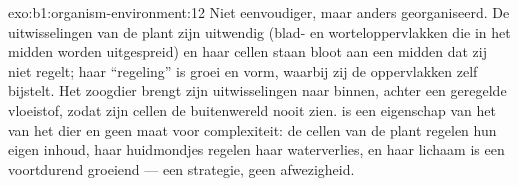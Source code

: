 \begin{solution}{exo:b1:organism-environment:12}
Niet eenvoudiger, maar anders georganiseerd. De uitwisselingen van de plant
zijn uitwendig (blad- en worteloppervlakken die in het midden worden
uitgespreid) en haar cellen staan bloot aan een midden dat zij niet regelt;
haar ``regeling'' is groei en vorm, waarbij zij de oppervlakken zelf bijstelt.
Het zoogdier brengt zijn uitwisselingen naar binnen, achter een geregelde
vloeistof, zodat zijn cellen de buitenwereld nooit zien.  is een
eigenschap van het  van het dier en geen maat voor complexiteit:
de cellen van de plant regelen hun eigen inhoud, haar huidmondjes regelen haar
waterverlies, en haar lichaam is een voortdurend groeiend
 --- een strategie, geen afwezigheid.
\end{solution}

